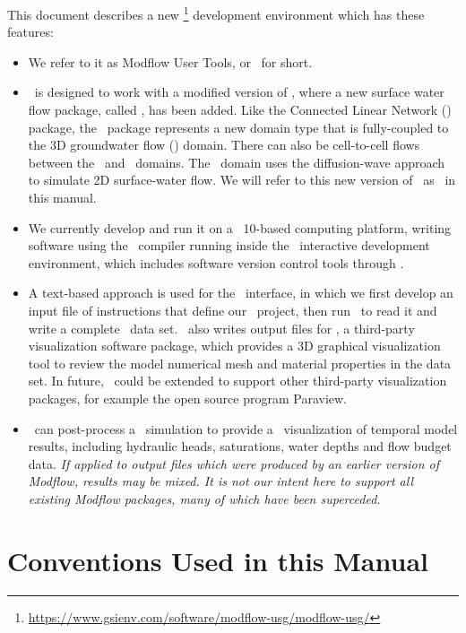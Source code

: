 \label{chapter:Introduction} This document describes a new \mfu\footnote{\url{https://www.gsienv.com/software/modflow-usg/modflow-usg/}}  development environment which has these features:
\begin{itemize}
    \item We refer to it as Modflow User Tools, or \mut\ for short.
    \item \mut\ is designed to work with a modified version of \mfu,  where a new surface water flow package, called \swf, has been added. Like the Connected Linear Network (\cln) package, the \swf\ package represents a new domain type that is fully-coupled to the 3D groundwater flow (\gwf) domain. There can also be cell-to-cell flows between the \swf\ and \cln\ domains.  The \swf\ domain uses the diffusion-wave approach to simulate 2D surface-water flow. We will refer to this new version of \mfu\ as \mfus\ in this manual.
    \item We currently develop and run it on a \windows\ 10-based computing platform, writing software using the \ifort\ compiler running inside the \vstudio\ interactive development environment, which includes software version control tools through \github.
    \item A text-based approach is used for the \mut\ interface, in which we first develop an input file of instructions that define our \mfus\ project,  then run \mut\ to read it and write a complete \mfus\ data set. \mut\ also writes output files for \tecplot, a third-party visualization software package, which provides a 3D graphical visualization tool to review the model numerical mesh and material properties in the data set. In future, \mut\ could be extended to support other third-party visualization packages, for example the open source program Paraview.
    \item \mut\ can post-process a \mfus\ simulation to provide a \tecplot\ visualization of temporal model results, including hydraulic heads, saturations, water depths and flow budget data.  \textit{If applied to output files which were produced by an earlier version of Modflow, results may be mixed.  It is not our intent here to support all existing Modflow packages, many of which have been superceded.}
\end{itemize}

        
\section{Conventions Used in this Manual} \label{section:AboutManual}

